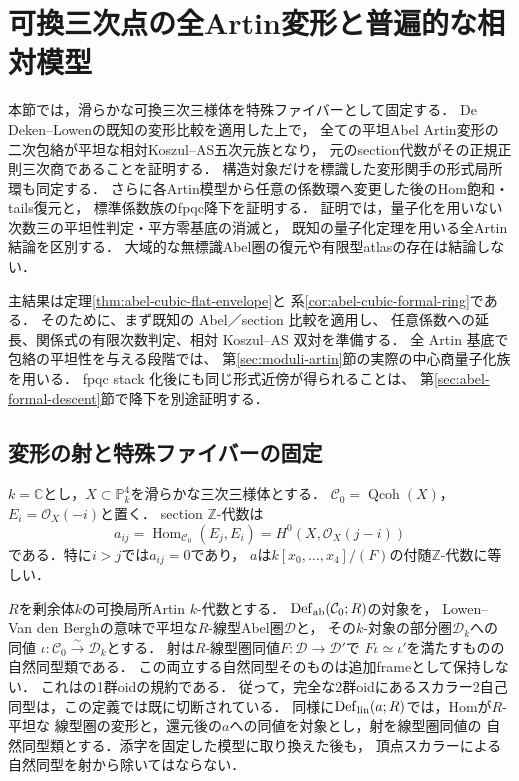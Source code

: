 \section{可換三次点の全Artin変形と普遍的な相対模型}
\label{sec:abel-formal-cubic}

本節では，滑らかな可換三次三様体を特殊ファイバーとして固定する．
De Deken--Lowenの既知の変形比較を適用した上で，
全ての平坦Abel Artin変形の二次包絡が平坦な相対Koszul--AS五次元族となり，
元のsection代数がその正規正則三次商であることを証明する．
構造対象だけを標識した変形関手の形式局所環も同定する．
さらに各Artin模型から任意の係数環へ変更した後のHom飽和・tails復元と，
標準係数族のfpqc降下を証明する．
証明では，量子化を用いない次数三の平坦性判定・平方零基底の消滅と，
既知の量子化定理を用いる全Artin結論を区別する．
大域的な無標識Abel圏の復元や有限型atlasの存在は結論しない．

主結果は定理\ref{thm:abel-cubic-flat-envelope}と
系\ref{cor:abel-cubic-formal-ring}である．
そのために、まず既知の Abel／section 比較を適用し、
任意係数への延長、関係式の有限次数判定、相対 Koszul--AS 双対を準備する．
全 Artin 基底で包絡の平坦性を与える段階では、
第\ref{sec:moduli-artin}節の実際の中心商量子化族を用いる．
fpqc stack 化後にも同じ形式近傍が得られることは、
第\ref{sec:abel-formal-descent}節で降下を別途証明する．

\subsection{変形の射と特殊ファイバーの固定}

$k=\mathbb C$とし，$X\subset\mathbb P^4_k$を滑らかな三次三様体とする．
$\mathcal C_0=\operatorname{Qcoh}(X)$，$E_i=\mathcal O_X(-i)$と置く．
section $\mathbb Z$-代数は
\[
 a_{ij}=\operatorname{Hom}_{\mathcal C_0}(E_j,E_i)
       =H^0(X,\mathcal O_X(j-i))
\]
である．特に$i>j$では$a_{ij}=0$であり，
$a$は$k[x_0,\ldots,x_4]/(F)$の付随$\mathbb Z$-代数に等しい．

$R$を剰余体$k$の可換局所Artin $k$-代数とする．
$\operatorname{Def}_{\rm ab}(\mathcal C_0;R)$の対象を，
Lowen--Van den Berghの意味で平坦な$R$-線型Abel圏$\mathcal D$と，
その$k$-対象の部分圏$\mathcal D_k$への同値
$\iota:\mathcal C_0\xrightarrow{\sim}\mathcal D_k$とする．
射は$R$-線型圏同値$F:\mathcal D\to\mathcal D'$で
$F\iota\simeq\iota'$を満たすものの自然同型類である．
この両立する自然同型そのものは追加frameとして保持しない．
これは\cite[\S8.2]{LowenVdBDeformation}の1群oidの規約である．
従って，完全な2群oidにあるスカラー2自己同型は，この定義では既に切断されている．
同様に$\operatorname{Def}_{\rm lin}(a;R)$では，Homが$R$-平坦な
線型圏の変形と，還元後の$a$への同値を対象とし，射を線型圏同値の
自然同型類とする．添字を固定した模型に取り換えた後も，
頂点スカラーによる自然同型を射から除いてはならない．

